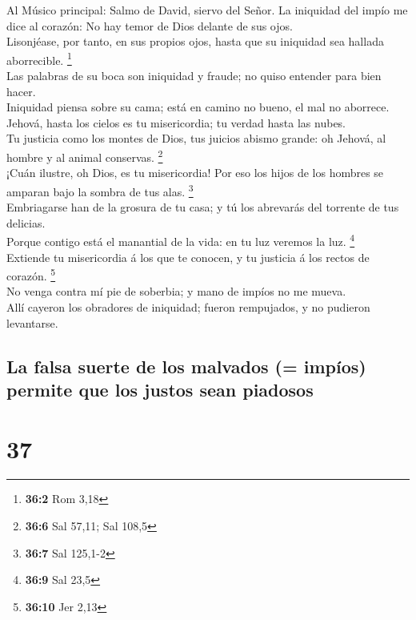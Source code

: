  Al Músico principal: Salmo de David, siervo del Señor. La
iniquidad del impío me dice al corazón: No hay temor de Dios delante de
sus ojos.\\
 Lisonjéase, por tanto, en sus propios ojos, hasta que su
iniquidad sea hallada aborrecible. \footnote{\textbf{36:2} Rom 3,18}\\
 Las palabras de su boca son iniquidad y fraude; no quiso
entender para bien hacer.\\
 Iniquidad piensa sobre su cama; está en camino no bueno,
el mal no aborrece.\\
 Jehová, hasta los cielos es tu misericordia; tu verdad
hasta las nubes.\\
 Tu justicia como los montes de Dios, tus juicios abismo
grande: oh Jehová, al hombre y al animal conservas. \footnote{\textbf{36:6}
  Sal 57,11; Sal 108,5}\\
 ¡Cuán ilustre, oh Dios, es tu misericordia! Por eso los
hijos de los hombres se amparan bajo la sombra de tus alas.
\footnote{\textbf{36:7} Sal 125,1-2}\\
 Embriagarse han de la grosura de tu casa; y tú los
abrevarás del torrente de tus delicias.\\
 Porque contigo está el manantial de la vida: en tu luz
veremos la luz. \footnote{\textbf{36:9} Sal 23,5}\\
 Extiende tu misericordia á los que te conocen, y tu
justicia á los rectos de corazón. \footnote{\textbf{36:10} Jer 2,13}\\
 No venga contra mí pie de soberbia; y mano de impíos no
me mueva.\\
 Allí cayeron los obradores de iniquidad; fueron
rempujados, y no pudieron levantarse.

\hypertarget{la-falsa-suerte-de-los-malvados-impuxedos-permite-que-los-justos-sean-piadosos}{%
\subsection{La falsa suerte de los malvados (= impíos) permite que los
justos sean
piadosos}\label{la-falsa-suerte-de-los-malvados-impuxedos-permite-que-los-justos-sean-piadosos}}

\hypertarget{section-36}{%
\section{37}\label{section-36}}

